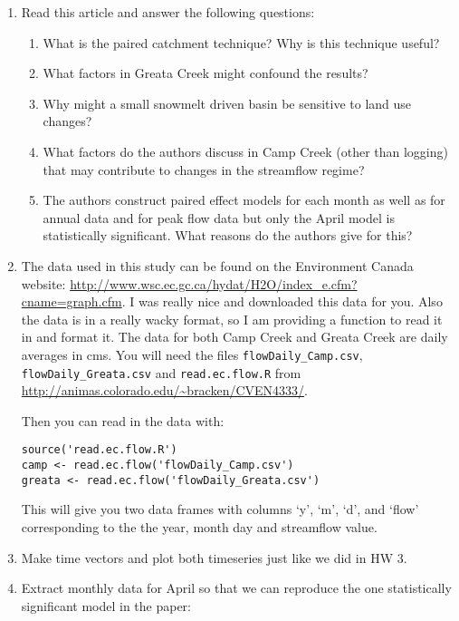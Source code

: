 \documentclass[11pt]{article}
\begin{document}
\begin{enumerate}

\item Read this article and answer the following questions: 

\begin{enumerate}
\item What is the paired catchment technique? Why is this technique useful?
\item What factors in Greata Creek might confound the results?
\item Why might a small snowmelt driven basin be sensitive to land use changes?
\item What factors do the authors discuss in Camp Creek (other than logging) that may contribute to changes in the streamflow regime?
\item The authors construct paired effect models for each month as well as for annual data and for peak flow data but only the April model is statistically significant.  What reasons do the authors give for this?
\end{enumerate}

\item The data used in this study can be found on the Environment Canada website: \url{http://www.wsc.ec.gc.ca/hydat/H2O/index_e.cfm?cname=graph.cfm}.  I was really nice and downloaded this data for you.  Also the data is in a really wacky format, so I am providing a function to read it in and format it. The data for both Camp Creek and Greata Creek are daily averages in cms. You will need the files \verb"flowDaily_Camp.csv", \verb"flowDaily_Greata.csv" and \verb"read.ec.flow.R" from \url{http://animas.colorado.edu/~bracken/CVEN4333/}.

Then you can read in the data with:

\begin{verbatim}
source('read.ec.flow.R')
camp <- read.ec.flow('flowDaily_Camp.csv')
greata <- read.ec.flow('flowDaily_Greata.csv')
\end{verbatim}

This will give you two data frames with columns `y', `m', `d', and `flow' corresponding to the the year, month day and streamflow value. 

\item Make time vectors and plot both timeseries just like we did in HW 3. 

\item Extract monthly data for April so that we can reproduce the one statistically significant model in the paper:


\end{enumerate}
\end{document}
